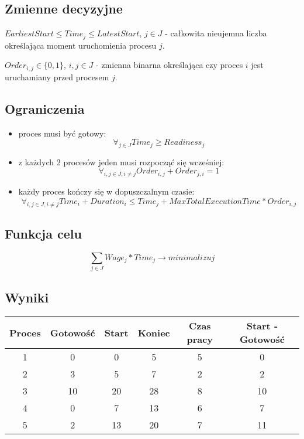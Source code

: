 \documentclass[polish,12pt,titlepage]{article}
\begin{document}
\subsection{Zmienne decyzyjne}

$EarliestStart \le Time_j \le LatestStart$, $j \in J$ - całkowita nieujemna liczba określająca moment uruchomienia procesu $j$.

$Order_{i,j} \in \{0,1\}$, $i,j \in J$ - zmienna binarna określająca czy proces $i$ jest uruchamiany przed procesem $j$.

\subsection{Ograniczenia}

\begin{itemize}
	\item proces musi być gotowy:
	$$\forall_{j \in J} Time_j \ge Readiness_j$$
	\item z każdych 2 procesów jeden musi rozpocząć się wcześniej:
	$$\forall_{i,j \in J, i \neq j} Order_{i,j} + Order_{j,i} = 1$$
	\item każdy proces kończy się w dopuszczalnym czasie:
	$$\forall_{i,j \in J, i \neq j} Time_i + Duration_i \le Time_j + MaxTotalExecutionTime * Order_{i,j}$$
\end{itemize}

\subsection{Funkcja celu}

$$\sum\limits_{j \in J} Wage_j * Time_j \longrightarrow minimalizuj$$

\subsection{Wyniki}

\begin{tabular}{ | c | c | c | c | c | c | }
	\hline
    Proces & Gotowość & Start & Koniec & Czas pracy & Start - Gotowość \\
    \hline
	1 & 0  & 0  & 5  & 5 & 0  \\
	2 & 3  & 5  & 7  & 2 & 2  \\
	3 & 10 & 20 & 28 & 8 & 10 \\
	4 & 0  & 7  & 13 & 6 & 7  \\
	5 & 2  & 13 & 20 & 7 & 11 \\
	\hline
\end{tabular}
\end{document}
